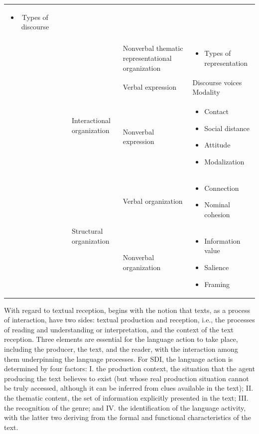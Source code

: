 \documentclass[english]{textolivre}
\begin{document}
\begin{table}[h!]
\begin{tabular}{cccp{3cm}p{3cm}p{5.5cm}}
\begin{itemize}
     \item Types of discourse
 \end{itemize} \\ \cline{5-6} 
 &  &  &  & Nonverbal thematic representational organization & \begin{itemize}
     \item Types of representation
 \end{itemize} \\ \cline{4-6} 
 &  &  & \multirow{2}{=}{Interactional organization} & Verbal expression & Discourse voices Modality \\ \cline{5-6} 
 &  &  &  & Nonverbal expression & \begin{itemize}
     \item Contact
     \item Social distance
     \item Attitude
     \item Modalization
 \end{itemize}  \\ \cline{4-6} 
 &  &  & \multirow{2}{=}{Structural organization} & Verbal organization & \begin{itemize}
     \item Connection
     \item Nominal cohesion
 \end{itemize} \\ \cline{5-6} 
 &  &  &  & Nonverbal organization & 
 \begin{itemize}
     \item Information value
     \item Salience
     \item Framing
 \end{itemize} \\ 
\bottomrule
\end{tabular}
\end{table}

With regard to textual reception, \textcite{leal2011organizaccao} begins with the notion that texts, as a process of interaction, have two sides: textual production and reception, i.e., the processes of reading and understanding or interpretation, and the context of the text reception. Three elements are essential for the language action to take place, including the producer, the text, and the reader, with the interaction among them underpinning the  language processes. For SDI, the language action is determined by four factors: I. the production context, the situation that the agent producing the text believes to exist (but whose real production situation cannot be truly accessed, although it can be inferred from clues available in the text); II. the thematic content,  the set of information explicitly presented in the text; III. the recognition of the genre; and IV. the identification of the language activity, with the latter two deriving from the formal and functional characteristics of the text.
\end{document}
